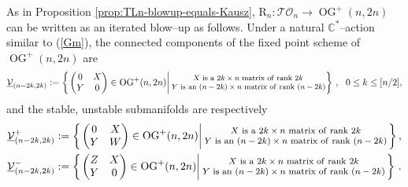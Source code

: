 \documentclass[10pt]{amsart}
\theoremstyle{definition}
\newcommand{\OG}{\operatorname{OG}}
\newcommand{\TO}{\mathcal{TO}}
\newcommand{\RL}{\mathrm{R}}
\theoremstyle{plain} %
\begin{document}
As in Proposition \ref{prop:TLn-blowup-equals-Kausz},
$\RL_n\colon\TO_n\to\OG^+(n,2n)$ can be written as an iterated blow--up as follows. 
Under a natural $\mathbb C^*$--action similar to (\ref{Gm}), the connected components of the fixed point scheme of $\OG^+(n,2n)$ are
\begin{equation*}%
\begin{split}
&\underline{\mathcal V}_{(n-2k,2k)} :=\left\{\left. \left(
\begin{matrix}
0&X\\
Y&0\\
\end{matrix}\right)\in \OG^+(n,2n)\right\vert_{}\footnotesize\begin{matrix}
X\,\,{\rm is\,\,a\,\,}2k\times n\,\,{\rm matrix\,\,of\,\,rank}\,\,2k\,\\
Y\,\,{\rm is\,\,an\,\,}(n-2k)\times n\,\,{\rm matrix\,\,of\,\,rank}\,\,(n-2k)\\
\end{matrix}
\right\}\,,\,\,\,\,0\leq k\leq [n/2],\\
\end{split}
\end{equation*}
and the stable, unstable submanifolds are respectively
\begin{equation}\label{ovani}
\begin{split}
&\underline{\mathcal V}_{(n-2k,2k)}^+:= \left\{\left.\left(
\begin{matrix}
0&X\\
Y&W\\
\end{matrix}\right)\in \OG^+(n,2n)\right\vert_{}\footnotesize\begin{matrix}
X\,\,{\rm is\,\,a\,\,}2k\times n\,\,{\rm matrix \,\,of\,\,rank\,\,}2k\,\\
Y\,\,{\rm is\,\,an\,\,}(n-2k)\times n\,\,{\rm matrix \,\,of\,\,rank\,\,}(n-2k)\,\\
\end{matrix}\right\},\\
&\underline{\mathcal V}_{(n-2k,2k)}^-:= \left\{\left.\left(
\begin{matrix}
Z&X\\
Y&0\\
\end{matrix}\right)\in \OG^+(n,2n)\right\vert_{}{\footnotesize\begin{matrix}
X\,\,{\rm is\,\,a\,\,}2k\times n\,\,{\rm matrix \,\,of\,\,rank\,\,}2k\,\\
Y\,\,{\rm is\,\,an\,\,}(n-2k)\times n\,\,{\rm matrix \,\,of\,\,rank\,\,}(n-2k)\,\\
\end{matrix}}\right\}\,.   
\end{split}
\end{equation}
\end{document}
